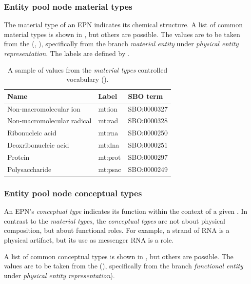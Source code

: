 \subsubsection{Entity pool node material types}
\label{sec:material-types-cv}

The material type of an EPN indicates its chemical structure.  A list of common material types is shown in , but others are possible.  The values are to be taken from the \sbo (\cite{Courtot:2011}, \sbourl), specifically from the branch \emph{material entity} under \emph{physical entity representation}.  The labels are defined by \SBGNPDLone.

\begin{table}[htb]
  \centering
  \begin{tabular}{l>{\ttfamily}l>{\ttfamily}l}
    \toprule
    \textbf{Name}              & \textbf{\rmfamily Label} & \textbf{\rmfamily SBO term} \\
    \midrule
    Non-macromolecular ion     & mt:ion  & SBO:0000327\\
    Non-macromolecular radical & mt:rad  & SBO:0000328\\
    Ribonucleic acid           & mt:rna  & SBO:0000250\\
    Deoxribonucleic acid       & mt:dna  & SBO:0000251\\
    Protein                    & mt:prot & SBO:0000297\\
    Polysaccharide             & mt:psac & SBO:0000249\\
    \bottomrule
  \end{tabular}
  \caption{A sample of values from the \emph{material types} controlled
    vocabulary ().}
  \label{tab:material-types-cv}
\end{table}


\subsubsection{Entity pool node conceptual types}
\label{sec:conceptual-types-cv}

An EPN's \emph{conceptual type} indicates its function within the context of a given \PD.  
In contrast to the \emph{material types}, the \emph{conceptual types} are not about physical composition, but about functional roles.  For example, a strand of RNA is a physical artifact, but its use as messenger RNA is a role.

A list of common conceptual types is shown in , but others are possible.  The values are to be taken from the \sbo (\sbourl), specifically from the branch \emph{functional entity} under \emph{physical entity representation}). 

